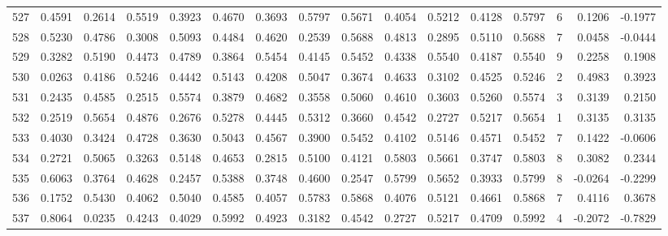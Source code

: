 \begin{tabular}{lrrrrrrrrrrrrrrr}
527 &      0.4591 &  0.2614 &  0.5519 &  0.3923 &  0.4670 &  0.3693 &  0.5797 &  0.5671 &  0.4054 &  0.5212 &   0.4128 &     0.5797 &      6 &                    0.1206 &                    -0.1977 \\
528 &      0.5230 &  0.4786 &  0.3008 &  0.5093 &  0.4484 &  0.4620 &  0.2539 &  0.5688 &  0.4813 &  0.2895 &   0.5110 &     0.5688 &      7 &                    0.0458 &                    -0.0444 \\
529 &      0.3282 &  0.5190 &  0.4473 &  0.4789 &  0.3864 &  0.5454 &  0.4145 &  0.5452 &  0.4338 &  0.5540 &   0.4187 &     0.5540 &      9 &                    0.2258 &                     0.1908 \\
530 &      0.0263 &  0.4186 &  0.5246 &  0.4442 &  0.5143 &  0.4208 &  0.5047 &  0.3674 &  0.4633 &  0.3102 &   0.4525 &     0.5246 &      2 &                    0.4983 &                     0.3923 \\
531 &      0.2435 &  0.4585 &  0.2515 &  0.5574 &  0.3879 &  0.4682 &  0.3558 &  0.5060 &  0.4610 &  0.3603 &   0.5260 &     0.5574 &      3 &                    0.3139 &                     0.2150 \\
532 &      0.2519 &  0.5654 &  0.4876 &  0.2676 &  0.5278 &  0.4445 &  0.5312 &  0.3660 &  0.4542 &  0.2727 &   0.5217 &     0.5654 &      1 &                    0.3135 &                     0.3135 \\
533 &      0.4030 &  0.3424 &  0.4728 &  0.3630 &  0.5043 &  0.4567 &  0.3900 &  0.5452 &  0.4102 &  0.5146 &   0.4571 &     0.5452 &      7 &                    0.1422 &                    -0.0606 \\
534 &      0.2721 &  0.5065 &  0.3263 &  0.5148 &  0.4653 &  0.2815 &  0.5100 &  0.4121 &  0.5803 &  0.5661 &   0.3747 &     0.5803 &      8 &                    0.3082 &                     0.2344 \\
535 &      0.6063 &  0.3764 &  0.4628 &  0.2457 &  0.5388 &  0.3748 &  0.4600 &  0.2547 &  0.5799 &  0.5652 &   0.3933 &     0.5799 &      8 &                   -0.0264 &                    -0.2299 \\
536 &      0.1752 &  0.5430 &  0.4062 &  0.5040 &  0.4585 &  0.4057 &  0.5783 &  0.5868 &  0.4076 &  0.5121 &   0.4661 &     0.5868 &      7 &                    0.4116 &                     0.3678 \\
537 &      0.8064 &  0.0235 &  0.4243 &  0.4029 &  0.5992 &  0.4923 &  0.3182 &  0.4542 &  0.2727 &  0.5217 &   0.4709 &     0.5992 &      4 &                   -0.2072 &                    -0.7829 \\

\end{tabular}
